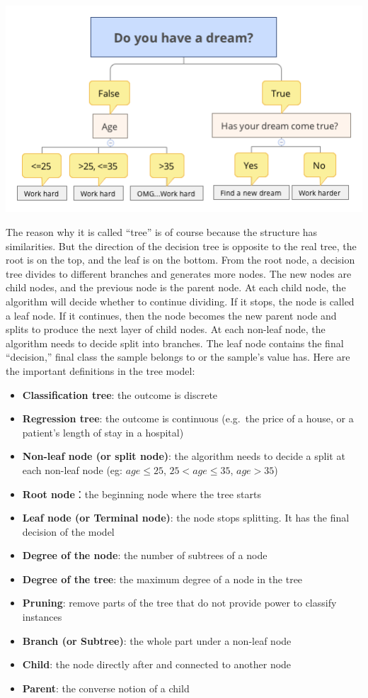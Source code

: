 \documentclass[12pt,]{krantz}
\providecommand{\tightlist}{%
  \setlength{\itemsep}{0pt}\setlength{\parskip}{0pt}}
\begin{document}
\includegraphics{../linhui.org/book/Figure/treeEN.png}

The reason why it is called ``tree'' is of course because the structure has similarities. But the direction of the decision tree is opposite to the real tree, the root is on the top, and the leaf is on the bottom. From the root node, a decision tree divides to different branches and generates more nodes. The new nodes are child nodes, and the previous node is the parent node. At each child node, the algorithm will decide whether to continue dividing. If it stops, the node is called a leaf node. If it continues, then the node becomes the new parent node and splits to produce the next layer of child nodes. At each non-leaf node, the algorithm needs to decide split into branches. The leaf node contains the final ``decision,'' final class the sample belongs to or the sample's value has. Here are the important definitions in the tree model:

\begin{itemize}
\tightlist
\item
  \textbf{Classification tree}: the outcome is discrete
\item
  \textbf{Regression tree}: the outcome is continuous (e.g.~the price of a house, or a patient's length of stay in a hospital)
\item
  \textbf{Non-leaf node (or split node)}: the algorithm needs to decide a split at each non-leaf node (eg: \(age \leq 25\), \(25 < age \leq 35\), \(age > 35\))
\item
  \textbf{Root node}：the beginning node where the tree starts
\item
  \textbf{Leaf node (or Terminal node)}: the node stops splitting. It has the final decision of the model
\item
  \textbf{Degree of the node}: the number of subtrees of a node
\item
  \textbf{Degree of the tree}: the maximum degree of a node in the tree
\item
  \textbf{Pruning}: remove parts of the tree that do not provide power to classify instances
\item
  \textbf{Branch (or Subtree)}: the whole part under a non-leaf node
\item
  \textbf{Child}: the node directly after and connected to another node
\item
  \textbf{Parent}: the converse notion of a child
\end{itemize}
\end{document}
